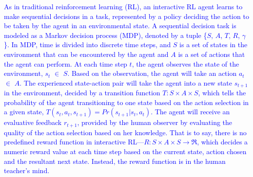 \textcolor{blue}{As in traditional reinforcement learning (RL), an interactive RL agent learns to make sequential decisions in a task, represented by a policy deciding the action to be taken by the agent in an environmental state. %
A sequential decision task is modeled as a Markov decision process (MDP), denoted by a tuple \{$S$, $A$, $T$, $R$, $\gamma$\}. In MDP, time is divided into discrete time steps, and $S$ is a set of states in the environment that can be encountered by the agent and $A$ is a set of actions that the agent can perform. At each time step $t$, the agent observes the state of the environment, $s_{t}$ $\in$ $S$. Based on the observation, the agent will take an action $a_{t}$ $\in$ $A$. The experienced state-action pair will take the agent into a new state $s_{t+1}$ in the environment, decided by a transition function $T: S \times A \times S$, which tells the probability of the agent transitioning to one state based on the action selection in a given state, $T(s_{t},a_{t},s_{t+1}) = Pr(s_{t+1}|s_{t}, a_{t})$.
The agent will receive an evaluative feedback $r_{t+1}$, provided by the human observer by evaluating the quality of the action selection based on her knowledge. That is to say, there is no predefined reward function in interactive RL---$R : S \times A \times S \rightarrow \Re$, which decides a numeric reward value at each time step based on the %
current state, action chosen and the resultant next state. Instead, the reward function is in the human teacher's mind.}



